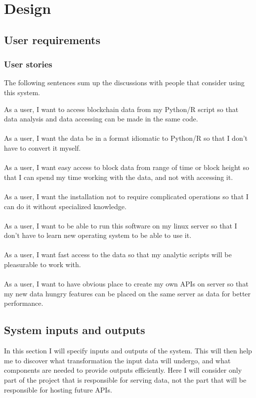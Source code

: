 \documentclass[12pt, en, eng, oneside]{mgr}
\begin{document}
\chapter{Design}

\section{User requirements}
\subsection{User stories}

The following sentences sum up the discussions with people that consider using this system.

As a user, I want to access blockchain data from my Python/R script so that data analysis and data accessing can be made in the same code.
\\
\\
As a user, I want the data be in a format idiomatic to Python/R so that I don't have to convert it myself.
\\
\\
As a user, I want easy access to block data from range of time or block height so that I can spend my time working with the data, and not with accessing it.
\\
\\
As a user, I want the installation not to require complicated operations so that I can do it without specialized knowledge.
\\
\\
As a user, I want to be able to run this software on my linux server so that I don't have to learn new operating system to be able to use it.
\\
\\
As a user, I want fast access to the data so that my analytic scripts will be pleasurable to work with.
\\
\\
As a user, I want to have obvious place to create my own APIs on server so that my new data hungry features can be placed on the same server as data for better performance.


\section{System inputs and outputs}

In this section I will specify inputs and outputs of the system. This will then help me to discover what transformation the input data will undergo, and what components are needed to provide outputs efficiently. Here I will consider only part of the project that is responsible for serving data, not the part that will be responsible for hosting future APIs.
\end{document}
